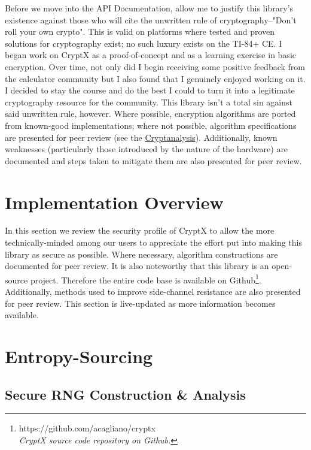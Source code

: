 \documentclass[titlepage]{report}
\begin{document}
	Before we move into the API Documentation, allow me to justify this library's existence against those who will cite the unwritten rule of cryptography--"Don't roll your own crypto". This is valid on platforms where tested and proven solutions for cryptography exist; no such luxury exists on the TI-84+ CE. I began work on CryptX as a proof-of-concept and as a learning exercise in basic encryption. Over time, not only did I begin receiving some positive feedback from the calculator community but I also found that I genuinely enjoyed working on it. I decided to stay the course and do the best I could to turn it into a legitimate cryptography resource for the community. This library isn't a total sin against said unwritten rule, however. Where possible, encryption algorithms are ported from known-good implementations; where not possible, algorithm specifications are presented for peer review (see the \href{sec:analysis}{Cryptanalysis}). Additionally, known weaknesses (particularly those introduced by the nature of the hardware) are documented and steps taken to mitigate them are also presented for peer review.
	
	
	\newpage
	\section{Implementation Overview}
	\label{sec:implementation_overview}
		In this section we review the security profile of CryptX to allow the more technically-minded among our users to appreciate the effort put into making this library as secure as possible. Where necessary, algorithm constructions are documented for peer review. It is also noteworthy that this library is an open-source project. Therefore the entire code base is available on Github\footnote{https://github.com/acagliano/cryptx\\\textit{CryptX source code repository on Github.}}. Additionally, methods used to improve side-channel resistance are also presented for peer review. This section is live-updated as more information becomes available. 
	
	\section {Entropy-Sourcing}
	\label{sec:entropy}
	

	\subsection{Secure RNG Construction \& Analysis}
	\label{ssec:csprng}
\end{document}

